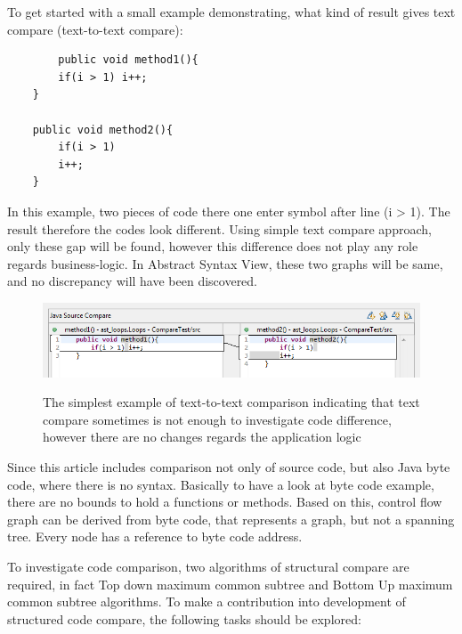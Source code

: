 \documentclass{report}
\begin{document}
To get started with a small example demonstrating, what kind of result gives text compare (text-to-text compare):

\begin{lstlisting}
		public void method1(){
		if(i > 1) i++;
	}
	
	public void method2(){
		if(i > 1) 
		i++;
	}

\end{lstlisting}
	
In this example, two pieces of code there one enter symbol after line (i > 1). The result therefore the codes look different. Using simple text compare approach, only these gap will be found, however this difference does not play any role regards business-logic. In Abstract Syntax View, these two graphs will be same, and no discrepancy will have been discovered.
\begin{figure}[h]
  \centering
  \includegraphics[scale=0.6]{Figures/introduction/intro-code-example}\\[0.1cm]
  \caption[Text to text comparison example]{The simplest example of text-to-text comparison indicating that text compare sometimes is not enough to investigate code difference, however there are no changes regards the application logic}
  \label{fig:intro-code-example}
\end{figure}

	
Since this article includes comparison not only of source code, but also Java byte code, where there is no syntax. Basically to have a look at byte code example, there are no bounds to hold a functions or methods. Based on this, control flow graph can be derived from byte code, that represents a graph, but not a spanning tree. Every node has a reference to byte code address.




To investigate code comparison, two algorithms of structural compare are required, in fact Top down maximum common subtree and Bottom Up maximum common subtree algorithms. To make a contribution into development of structured code compare, the following tasks should be explored:
\end{document}
